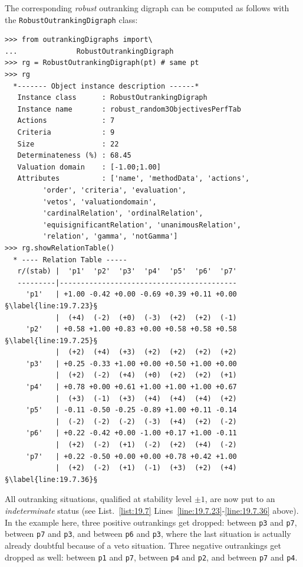 The corresponding \emph{robust} outranking digraph can be computed as follows with the \texttt{RobustOutrankingDigraph} class:
\begin{lstlisting}[caption={Computing a robust outranking digraph},label=list:19.7]
>>> from outrankingDigraphs import\
...              RobustOutrankingDigraph
>>> rg = RobustOutrankingDigraph(pt) # same pt
>>> rg
  *------- Object instance description ------*
   Instance class      : RobustOutrankingDigraph
   Instance name       : robust_random3ObjectivesPerfTab
   Actions             : 7
   Criteria            : 9
   Size                : 22
   Determinateness (%) : 68.45
   Valuation domain    : [-1.00;1.00]
   Attributes          : ['name', 'methodData', 'actions',
         'order', 'criteria', 'evaluation',
         'vetos', 'valuationdomain',
         'cardinalRelation', 'ordinalRelation',
         'equisignificantRelation', 'unanimousRelation',
         'relation', 'gamma', 'notGamma']
>>> rg.showRelationTable()
  * ---- Relation Table -----
   r/(stab) |  'p1'  'p2'  'p3'  'p4'  'p5'  'p6'  'p7'   
   ---------|------------------------------------------
     'p1'   | +1.00 -0.42 +0.00 -0.69 +0.39 +0.11 +0.00  §\label{line:19.7.23}§
            |  (+4)  (-2)  (+0)  (-3)  (+2)  (+2)  (-1)  
     'p2'   | +0.58 +1.00 +0.83 +0.00 +0.58 +0.58 +0.58  §\label{line:19.7.25}§
            |  (+2)  (+4)  (+3)  (+2)  (+2)  (+2)  (+2)  
     'p3'   | +0.25 -0.33 +1.00 +0.00 +0.50 +1.00 +0.00  
            |  (+2)  (-2)  (+4)  (+0)  (+2)  (+2)  (+1)  
     'p4'   | +0.78 +0.00 +0.61 +1.00 +1.00 +1.00 +0.67  
            |  (+3)  (-1)  (+3)  (+4)  (+4)  (+4)  (+2)  
     'p5'   | -0.11 -0.50 -0.25 -0.89 +1.00 +0.11 -0.14  
            |  (-2)  (-2)  (-2)  (-3)  (+4)  (+2)  (-2)  
     'p6'   | +0.22 -0.42 +0.00 -1.00 +0.17 +1.00 -0.11  
            |  (+2)  (-2)  (+1)  (-2)  (+2)  (+4)  (-2)  
     'p7'   | +0.22 -0.50 +0.00 +0.00 +0.78 +0.42 +1.00  
            |  (+2)  (-2)  (+1)  (-1)  (+3)  (+2)  (+4)  §\label{line:19.7.36}§
\end{lstlisting}

All outranking situations, qualified at stability level $\pm 1$, are now put to an \emph{indeterminate} status (see List.~\ref{list:19.7} Lines~\ref{line:19.7.23}-\ref{line:19.7.36} above). In the example here, three positive outrankings get dropped: between \texttt{p3} and \texttt{p7}, between \texttt{p7} and \texttt{p3}, and between \texttt{p6} and \texttt{p3}, where the last situation is actually already doubtful because of a veto situation. Three negative outrankings get dropped as well: between \texttt{p1} and \texttt{p7}, between \texttt{p4} and \texttt{p2}, and between \texttt{p7} and \texttt{p4}.

